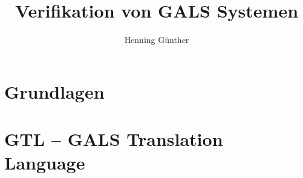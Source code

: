 \documentclass[10pt]{scrbook}
\title{Verifikation von GALS Systemen}
\author{Henning Günther}
\begin{document}
\maketitle

\tableofcontents

\chapter{Grundlagen}

\chapter{GTL -- GALS Translation Language}






\end{document}
